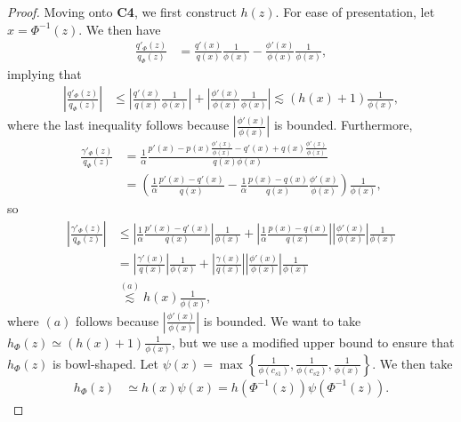 \documentclass{article}
\begin{document}
\begin{proof}
Moving onto \textbf{C4}, we first construct $h(z)$. For ease of presentation, let $x = \Phi^{-1}(z)$. We then have
\begin{align*}
\frac{q'_\Phi(z)}{q_\Phi(z)} &= \frac{ q'(x) }{q(x)} \frac{1}{ \phi(x)} - 
                     \frac{ \phi'(x) }{\phi(x)} \frac{1}{ \phi(x)},
\end{align*}
implying that
\begin{align*}
\left| \frac{q'_\Phi(z)}{q_\Phi(z)} \right| &\leq 
      \left| \frac{ q'(x) }{q(x)} \frac{1}{ \phi(x)} \right| +  
     \left| \frac{ \phi'(x) }{\phi(x)} \frac{1}{ \phi(x)} \right| \lesssim (h(x) + 1) \frac{1}{\phi(x)} ,
\end{align*}
where the last inequality follows because $\left| \frac{\phi'(x)}{\phi(x)} \right|$ is bounded. Furthermore,
\begin{align*}
 \frac{\gamma'_\Phi(z)}{q_\Phi(z)} &=   
       \frac{1}{\alpha} 
    \frac{p'(x) - p(x) \frac{\phi'(x)}{\phi(x)} - q'(x) + q(x) \frac{\phi'(x)}{\phi(x)} }
                                       {q(x) \phi(x) } \nonumber \\
  &=  \left( \frac{1}{\alpha} \frac{p'(x) - q'(x)}{q(x)} 
          - \frac{1}{\alpha} \frac{p(x) - q(x)}{q(x)} \frac{\phi'(x)}{\phi(x)}\right)
         \frac{1}{\phi(x)},
\end{align*}
so
\begin{align*}   
\left|  \frac{\gamma'_\Phi(z)}{q_\Phi(z)} \right| &\leq
      \left| \frac{1}{\alpha} \frac{p'(x) - q'(x)}{q(x)} \right| 
            \frac{1}{\phi(x)} 
          + \left| \frac{1}{\alpha} \frac{p(x) - q(x)}{q(x)} \right| 
        \left| \frac{\phi'(x)}{\phi(x)}\right|   
         \frac{1}{\phi(x)} \\
  & = \left| \frac{\gamma'(x)}{q(x)} \right| \frac{1}{\phi(x)} + 
       \left| \frac{\gamma(x)}{q(x)} \right| \left| \frac{\phi'(x)}{\phi(x)} \right| \frac{1}{\phi(x)}\\
  &\stackrel{(a)} \lesssim h(x) \frac{1}{ \phi(x)},
\end{align*}
where $(a)$ follows because $\left| \frac{\phi'(x)}{\phi(x)} \right|$ is bounded. We want to take $h_{\Phi}(z) \simeq (h(x) + 1) \frac{1}{\phi(x)}$, but we use a modified upper bound to ensure that $h_{\Phi}(z)$ is bowl-shaped. Let $\psi(x) = \max \left\{ \frac{1}{\phi(c_{s1})}, \frac{1}{\phi(c_{s2})}, \frac{1}{\phi(x)} \right\} $. We then take 
\begin{align*}
h_{\Phi}(z) &\simeq h(x) \psi(x) = h( \Phi^{-1}(z)) \psi(\Phi^{-1}(z)).
\end{align*}


\end{proof}
\end{document}
